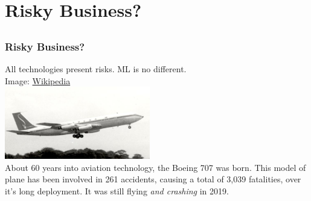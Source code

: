 \documentclass[11pt,
               aspectratio=169,
               hyperref={colorlinks}
               ]{beamer}
\begin{document}
	\section{Risky Business?}

	\subsection*{} %

	\begin{frame}[t]
		
		\frametitle{Risky Business?}		
		\centering
		All technologies present risks. ML is no different.\\
		\vspace{10pt}
		\tiny{Image: \href{https://en.wikipedia.org/wiki/Boeing_707}{Wikipedia}}\\		
		\includegraphics[height=90pt]{img/707.jpg}\\
		\vspace{10pt}
		\normalsize{About 60 years into aviation technology, the Boeing 707 was born. This model of plane has been involved in 261 accidents, causing a total of 3,039 fatalities, over it's long deployment. It was still flying \textit{and crashing} in 2019.}
		
	\end{frame}
	
	\subsection*{} %
\end{document}
